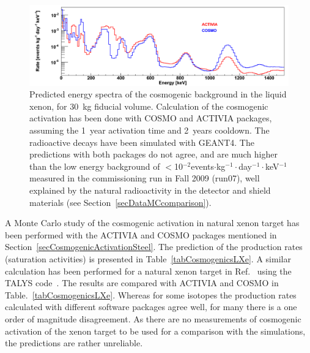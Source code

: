 \begin{figure}[!t]
\centering
\includegraphics[width=0.75\linewidth]{plots/Cosmogenics/ACTIVIA_COSMO_wide1.png}
\caption[Predicted energy spectra of the cosmogenic background in the liquid xenon]{Predicted energy spectra of the cosmogenic background in the liquid xenon, for 30~kg fiducial volume. Calculation of the cosmogenic activation has been done with COSMO and ACTIVIA packages, assuming the 1~year activation time and 2~years cooldown. The radioactive decays have been simulated with GEANT4. The predictions with both packages do not agree, and are much higher than the low energy background of $<$10$^{-2}$events$\cdot$kg$^{-1}\cdot$day$^{-1}\cdot$keV$^{-1}$ measured in the commissioning run in Fall 2009 (run07), well explained by the natural radioactivity in the detector and shield materials (see Section~\ref{secDataMCcomparison}).}
\label{figCosmogenicsLXe}
\end{figure}

A Monte Carlo study of the cosmogenic activation in natural xenon target has been performed with the ACTIVIA and COSMO packages mentioned in Section~\ref{secCosmogenicActivationSteel}. The prediction of the production rates (saturation activities) is  presented in Table~\ref{tabCosmogenicsLXe}. 
A similar calculation has been performed for a natural xenon target in Ref.~\cite{CosmogenicProduction_Mei} using the TALYS code~\cite{talys}. The results are compared with ACTIVIA and COSMO in Table.~\ref{tabCosmogenicsLXe}. 
Whereas for some isotopes the production rates calculated with different software packages agree well, for many there is a one order of magnitude disagreement. 
As there are no measurements of cosmogenic activation of the xenon target to be used for a  comparison with the simulations, the predictions are rather unreliable.

